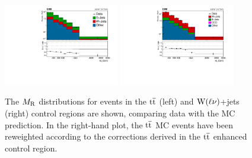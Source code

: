 \begin{figure}[!htb] \centering
\includegraphics[width=0.45\textwidth]{figs/analysis13TeV/TTBarWJets/MR_TTJetsSingleLepton.pdf}
\includegraphics[width=0.45\textwidth]{figs/analysis13TeV/TTBarWJets/MR_WJetsSingleLepton.pdf}
\caption{ The $M_\mathrm{R}$ distributions for events in the $\mathrm{t}\overline{\mathrm{t}}$ (left) and $\mathrm{W}(\ell\nu)$+jets (right) 
control regions are shown, comparing data with the MC prediction.  In the right-hand plot, the $\mathrm{t}\overline{\mathrm{t}}$ MC events have been reweighted according to the corrections derived in the $\mathrm{t}\overline{\mathrm{t}}$ enhanced control region.  
 }
\label{fig:TTBarWJetsCR_MR}
\end{figure}

